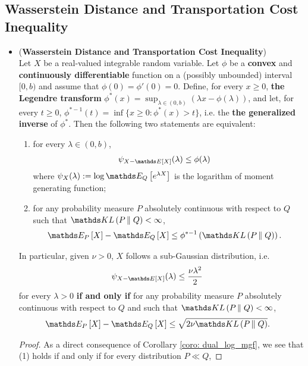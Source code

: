 \documentclass[11pt]{article}
\begin{document}
\subsection{Wasserstein Distance and Transportation Cost Inequality}
\begin{itemize}
\item \begin{proposition} (\textbf{Wasserstein Distance and Transportation Cost Inequality}) \citep{boucheron2013concentration}\\
Let $X$ be a real-valued integrable random variable. Let $\phi$ be a \textbf{convex} and \textbf{continuously differentiable} function on a (possibly unbounded) interval $[0, b)$ and assume that $\phi(0) = \phi'(0) = 0$. Define, for every $x \ge 0$, \textbf{the Legendre transform} $\phi^{*}(x) = \sup_{\lambda \in (0,b)}(\lambda x - \phi(\lambda))$, and let, for every $t \ge 0$, $\phi^{*-1}(t) = \inf\{x \ge 0: \phi^{*}(x) > t\}$, i.e. the \textbf{the generalized inverse} of $\phi^{*}$. Then the following two statements are equivalent:
\begin{enumerate}
\item for every $\lambda \in (0,b)$,
\begin{align*}
\psi_{X - \E{}{X}}(\lambda) &\le \phi(\lambda)
\end{align*} where $\psi_{X}(\lambda):= \log\E{Q}{e^{\lambda X}}$ is the logarithm of moment generating function;
\item for any probability measure $P$ absolutely continuous with respect to $Q$ such that $\kl{P}{Q} < \infty$,
\begin{align}
\E{P}{X} - \E{Q}{X} &\le \phi^{*-1}\paren{\kl{P}{Q}}. \label{ineqn: information_inequality_general}
\end{align} 
\end{enumerate}
In particular, given $\nu > 0$, $X$ follows a sub-Gaussian distribution, i.e.
\begin{align*}
\psi_{X - \E{}{X}}(\lambda) &\le \frac{\nu\lambda^2}{2}
\end{align*} for every $\lambda >0$ \textbf{if and only if} for any probability measure $P$ absolutely continuous with respect to $Q$ and such that $\kl{P}{Q} < \infty$, 
\begin{align}
\E{P}{X} - \E{Q}{X} &\le \sqrt{2\nu\kl{P}{Q}}. \label{ineqn: information_inequality_sub_gaussian}
\end{align}
\end{proposition}
\begin{proof}
As a direct consequence of Corollary \ref{coro: dual_log_mgf}, we see that (1) holds if and only if for every distribution $P \ll Q$, 

\end{proof}
\end{itemize}
\end{document}
